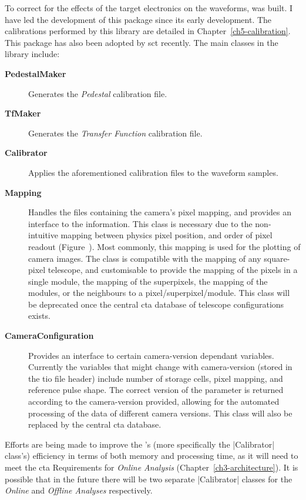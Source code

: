 \noindent To correct for the effects of the \gls{target} electronics on the waveforms,  was built. I have led the development of this package since its early development. The calibrations performed by this library are detailed in Chapter~\ref{ch5-calibration}. This package has also been adopted by \gls{sct} recently. The main classes in the library include:

\lstset{language=C++}
\begin{description}
\item [\textbf{PedestalMaker}] Generates the \textit{Pedestal} calibration file.
\item [\textbf{TfMaker}] Generates the \textit{Transfer Function} calibration file.
\item [\textbf{Calibrator}] Applies the aforementioned calibration files to the waveform samples.
\item [\textbf{Mapping}] Handles the files containing the camera's pixel mapping, and provides an interface to the information. This class is necessary due to the non-intuitive mapping between physics pixel position, and order of pixel readout (Figure~). Most commonly, this mapping is used for the plotting of camera images. The class is compatible with the mapping of any square-pixel telescope, and customisable to provide the mapping of the pixels in a single module, the mapping of the superpixels, the mapping of the modules, or the neighbours to a pixel/superpixel/module. This class will be deprecated once the central \gls{cta} database of telescope configurations exists.
\item [\textbf{CameraConfiguration}] Provides an interface to certain camera-version dependant variables. Currently the variables that might change with camera-version (stored in the \gls{tio} file header) include number of storage cells, pixel mapping, and reference pulse shape. The correct version of the parameter is returned according to the camera-version provided, allowing for the automated processing of the data of different camera versions. This class will also be replaced by the central \gls{cta} database.
\end{description}

Efforts are being made to improve the 's (more specifically the |Calibrator| class's) efficiency in terms of both memory and processing time, as it will need to meet the \gls{cta} Requirements for \textit{Online Analysis} (Chapter~\ref{ch3-architecture}). It is possible that in the future there will be two separate |Calibrator| classes for the \textit{Online} and \textit{Offline Analyses} respectively.

